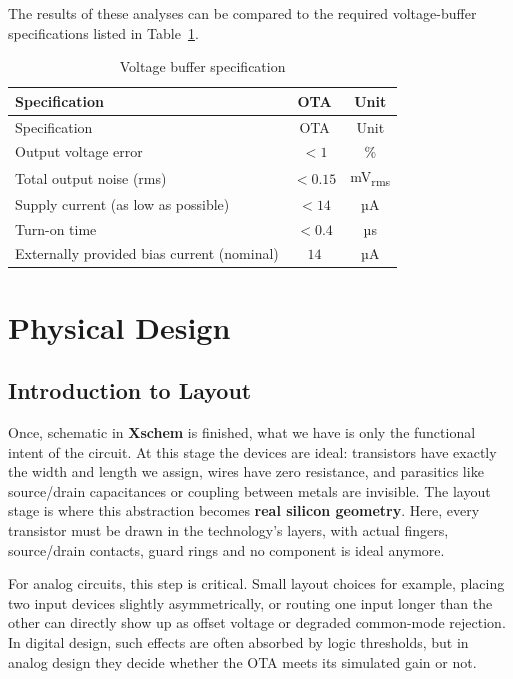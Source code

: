\documentclass[
  11pt,
  a4paper,
  oneside]{scrbook}
\begin{document}
The results of these analyses can be compared to the required
voltage-buffer specifications listed in
Table~\ref{tbl-voltage-buffer-spec}.

\begin{longtable}[]{@{}lcc@{}}
\caption{Voltage buffer
specification}\label{tbl-voltage-buffer-spec}\tabularnewline
\toprule\noalign{}
Specification & OTA & Unit \\
\midrule\noalign{}
\endfirsthead
\toprule\noalign{}
Specification & OTA & Unit \\
\midrule\noalign{}
\endhead
\bottomrule\noalign{}
\endlastfoot
Output voltage error & \(<1\) & \% \\
Total output noise (rms) & \(<0.15\) & mV\textsubscript{rms} \\
Supply current (as low as possible) & \(<14\) & µA \\
Turn-on time & \(<0.4\) & µs \\
Externally provided bias current (nominal) & \(14\) & µA \\
\end{longtable}

\part{Physical Design}

\chapter{Introduction to Layout}\label{introduction-to-layout}

Once, schematic in \textbf{Xschem} is finished, what we have is only the
functional intent of the circuit. At this stage the devices are ideal:
transistors have exactly the width and length we assign, wires have zero
resistance, and parasitics like source/drain capacitances or coupling
between metals are invisible. The layout stage is where this abstraction
becomes \textbf{real silicon geometry}. Here, every transistor must be
drawn in the technology's layers, with actual fingers, source/drain
contacts, guard rings and no component is ideal anymore.

For analog circuits, this step is critical. Small layout choices for
example, placing two input devices slightly asymmetrically, or routing
one input longer than the other can directly show up as offset voltage
or degraded common-mode rejection. In digital design, such effects are
often absorbed by logic thresholds, but in analog design they decide
whether the OTA meets its simulated gain or not.
\end{document}
